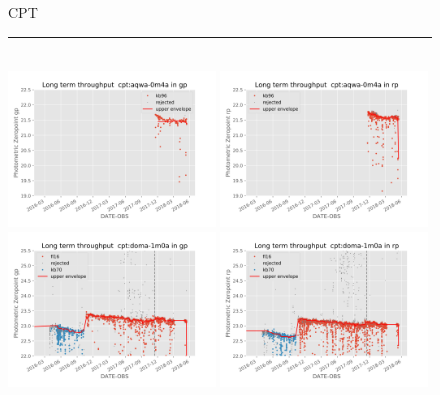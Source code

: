 \documentclass[]{spie}
\begin{document}
\begin{figure}\ContinuedFloat
\centering
CPT \\ 
\rule{\textwidth}{0.4pt} \\
\includegraphics[width=0.49\textwidth]{images/photzptrend-cpt-aqwa-0m4a-gp.png} \hspace*{\fill}
\includegraphics[width=0.49\textwidth]{images/photzptrend-cpt-aqwa-0m4a-rp.png} \\
\includegraphics[width=0.49\textwidth]{images/photzptrend-cpt-doma-1m0a-gp.png} \hspace*{\fill} 
\includegraphics[width=0.49\textwidth]{images/photzptrend-cpt-doma-1m0a-rp.png} \\

\end{figure}
\end{document}
